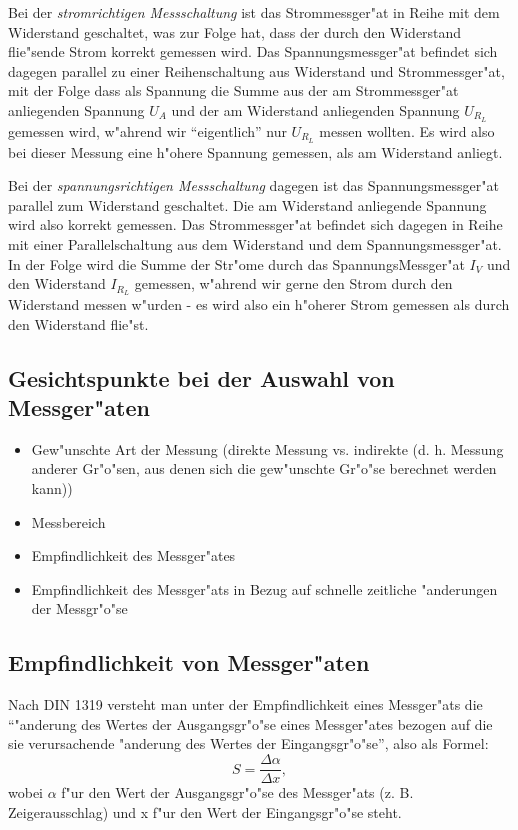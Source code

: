 \documentclass[10pt]{scrartcl}
\begin{document}
Bei der \emph{stromrichtigen Messschaltung} ist das Strommessger"at in Reihe mit dem Widerstand geschaltet, was zur Folge hat, dass der durch den Widerstand flie"sende Strom korrekt gemessen wird. Das Spannungsmessger"at befindet sich dagegen parallel zu einer Reihenschaltung aus Widerstand und Strommessger"at, mit der Folge dass als Spannung die Summe aus der am Strommessger"at anliegenden Spannung $U_A$ und der am Widerstand anliegenden Spannung $U_{R_L}$ gemessen wird, w"ahrend wir "`eigentlich"' nur $U_{R_L}$ messen wollten. Es wird also bei dieser Messung eine h"ohere  Spannung gemessen, als am Widerstand anliegt.

Bei der \emph{spannungsrichtigen Messschaltung} dagegen ist das Spannungsmessger"at parallel zum Widerstand geschaltet. Die am Widerstand anliegende Spannung wird also korrekt gemessen. Das Strommessger"at befindet sich dagegen in Reihe mit einer Parallelschaltung aus dem Widerstand und dem Spannungsmessger"at. In der Folge wird die Summe der Str"ome durch das SpannungsMessger"at $I_V$ und den Widerstand $I_{R_L}$ gemessen, w"ahrend wir gerne den Strom durch den Widerstand messen w"urden - es wird also ein h"oherer Strom gemessen als durch den Widerstand flie"st.

\subsection{Gesichtspunkte bei der Auswahl von Messger"aten}

\begin{itemize}
\item Gew"unschte Art der Messung (direkte Messung vs. indirekte (d. h. Messung anderer Gr"o"sen, aus denen sich die gew"unschte Gr"o"se berechnet werden kann))
\item Messbereich
\item Empfindlichkeit des Messger"ates
\item Empfindlichkeit des Messger"ats in Bezug auf schnelle zeitliche "anderungen der Messgr"o"se
\end{itemize}

\subsection{Empfindlichkeit von Messger"aten}

Nach DIN 1319 versteht man unter der Empfindlichkeit eines Messger"ats die "`"anderung des Wertes der Ausgangsgr"o"se eines Messger"ates  bezogen auf die sie verursachende "anderung des Wertes der Eingangsgr"o"se"', also als Formel:
\begin{displaymath}
S = \frac{\Delta \alpha}{\Delta x},
\end{displaymath}
wobei $\alpha$ f"ur den Wert der Ausgangsgr"o"se des Messger"ats (z. B. Zeigerausschlag) und x f"ur den Wert der Eingangsgr"o"se steht.
\end{document}
